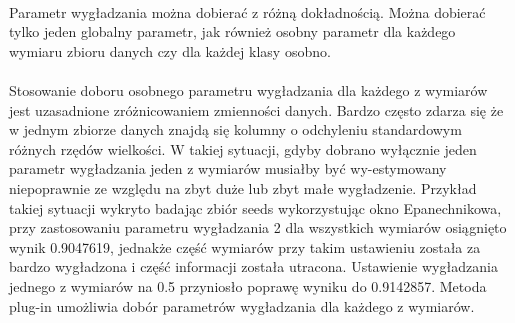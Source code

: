 \documentclass[a4paper,12pt,twoside]{article}
\begin{document}
\paragraph{}
Parametr wygładzania można dobierać z różną dokładnością.  Można dobierać tylko jeden globalny parametr, jak również osobny parametr dla każdego wymiaru zbioru danych czy dla każdej klasy osobno. 
\paragraph{}
Stosowanie doboru osobnego parametru wygładzania dla każdego z wymiarów jest uzasadnione zróżnicowaniem zmienności danych. Bardzo często zdarza się że w jednym zbiorze danych znajdą się kolumny o odchyleniu standardowym różnych rzędów wielkości. W takiej sytuacji, gdyby dobrano wyłącznie jeden parametr wygładzania jeden z wymiarów musiałby być wy-estymowany niepoprawnie ze względu na zbyt duże lub zbyt małe wygładzenie. Przykład takiej sytuacji wykryto badając zbiór seeds wykorzystując okno Epanechnikowa, przy zastosowaniu parametru wygładzania 2 dla wszystkich wymiarów osiągnięto wynik 0.9047619, jednakże część wymiarów przy takim ustawieniu została za bardzo wygładzona i część informacji została utracona. Ustawienie wygładzania jednego z wymiarów na 0.5 przyniosło poprawę wyniku do 0.9142857. Metoda plug-in umożliwia dobór parametrów wygładzania dla każdego z wymiarów. 
\end{document}
